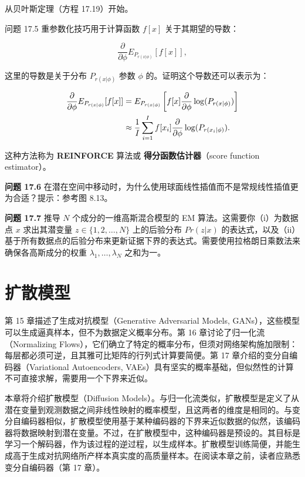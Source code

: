 \documentclass[lang=cn,newtx,10pt,scheme=chinese]{elegantbook}
\begin{document}
从贝叶斯定理（方程 17.19）开始。

问题 17.5 重参数化技巧用于计算函数 \(f[x]\) 关于其期望的导数：

\begin{equation}
\frac{\partial}{\partial\phi} E_{P_{r(x|\phi)}} [f[x]], 
\end{equation}

这里的导数是关于分布 \(P_{r(x|\phi)}\) 参数 \(\phi\) 的。证明这个导数还可以表示为：


\begin{align}
\frac{\partial}{\partial\phi} E_{P_{r(x|\phi)}} [f[x]] &= E_{P_{r(x|\phi)}} \left[ f[x] \frac{\partial}{\partial\phi} \log(P_{r(x|\phi)}) \right] \notag \\
&\approx \frac{1}{I} \sum_{i=1}^{I} f[x_i] \frac{\partial}{\partial\phi} \log(P_{r(x_i|\phi)}). 
\end{align} 


这种方法称为 \textbf{REINFORCE} 算法或 \textbf{得分函数估计器}（score function estimator）。

\textbf{问题 17.6} 在潜在空间中移动时，为什么使用球面线性插值而不是常规线性插值更为合适？提示：参考图 8.13。

\textbf{问题 17.7} 推导 \(N\) 个成分的一维高斯混合模型的 EM 算法。这需要你（i）为数据点 \(x\) 求出其潜变量 \(z \in \{1, 2, \ldots, N\}\) 上的后验分布 \(Pr(z|x)\) 的表达式，以及（ii）基于所有数据点的后验分布来更新证据下界的表达式。需要使用拉格朗日乘数法来确保各高斯成分的权重 \(\lambda_1, \ldots, \lambda_N\) 之和为一。


\chapter{扩散模型}

第 15 章描述了生成对抗模型（Generative Adversarial Models, GANs），这些模型可以生成逼真样本，但不为数据定义概率分布。第 16 章讨论了归一化流（Normalizing Flows），它们确立了特定的概率分布，但须对网络架构施加限制：每层都必须可逆，且其雅可比矩阵的行列式计算要简便。第 17 章介绍的变分自编码器（Variational Autoencoders, VAEs）具有坚实的概率基础，但似然性的计算不可直接求解，需要用一个下界来近似。

本章将介绍扩散模型（Diffusion Models）。与归一化流类似，扩散模型是定义了从潜在变量到观测数据之间非线性映射的概率模型，且这两者的维度是相同的。与变分自编码器相似，扩散模型使用基于某种编码器的下界来近似数据的似然，该编码器将数据映射到潜在变量。不过，在扩散模型中，这种编码器是预设的。其目标是学习一个解码器，作为该过程的逆过程，以生成样本。扩散模型训练简便，并能生成高于生成对抗网络所产样本真实度的高质量样本。在阅读本章之前，读者应熟悉变分自编码器（第 17 章）。
\end{document}
